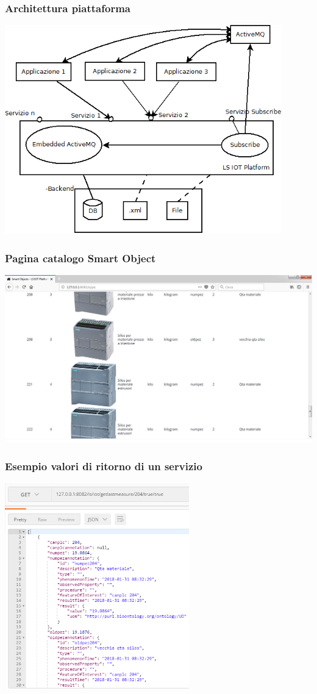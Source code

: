\documentclass{beamer}
\begin{document}
\begin{frame}
\frametitle{Architettura piattaforma}
\includegraphics[width=0.9\textwidth]{images/architettura_piattaforma.png}
\end{frame}

\begin{frame}
\frametitle{Pagina catalogo Smart Object}
\includegraphics[width=1\textwidth]{images/SmartObjectsPlatform.png}
\end{frame}

\begin{frame}
\frametitle{Esempio valori di ritorno di un servizio}
\includegraphics[width=0.6\textwidth]{images/Postman1.png}
\end{frame}
\end{document}
